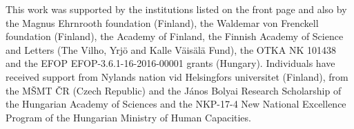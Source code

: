 This work was supported by the institutions listed on the front page and also by the Magnus Ehrnrooth foundation (Finland), the Waldemar von Frenckell foundation (Finland), the Academy of Finland, the Finnish Academy of Science and Letters (The Vilho, Yrj\"o and Kalle V\"ais\"al\"a Fund), the OTKA NK 101438 and the EFOP EFOP-3.6.1-16-2016-00001 grants (Hungary). Individuals have received support from Nylands nation vid Helsingfors universitet (Finland), from the M\v SMT \v CR (Czech Republic) and the J\'anos Bolyai Research Scholarship of the Hungarian Academy of Sciences and the NKP-17-4 New National Excellence Program of the Hungarian Ministry of Human Capacities.
